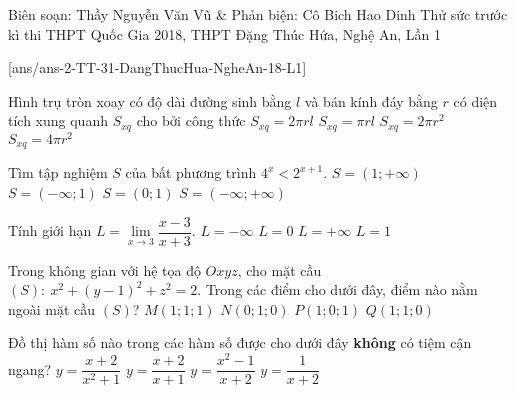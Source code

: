 \begin{name}
{Biên soạn: Thầy Nguyễn Văn Vũ \& Phản biện: Cô Bich Hao Dinh}
{Thử sức trước kì thi THPT Quốc Gia 2018, THPT Đặng Thúc Hứa, Nghệ An, Lần 1}
\end{name}
\setcounter{ex}{0}\setcounter{bt}{0}
[ans/ans-2-TT-31-DangThucHua-NgheAn-18-L1]
\begin{ex}%
Hình trụ tròn xoay có độ dài đường sinh bằng $l$ và bán kính đáy bằng $r$ có diện tích xung quanh $S_{xq}$ cho bởi công thức
\choice
{\True $S_{xq}=2\pi rl$}
{$S_{xq}=\pi rl$}
{$S_{xq}=2\pi r^2$}
{$S_{xq}=4\pi r^2$}
\loigiai{
}
\end{ex}

\begin{ex}%
Tìm tập nghiệm $S$ của bất phương trình $4^x<2^{x+1}$.
\choice
{$S=(1;+\infty)$}
{\True $S=(-\infty;1)$}
{$S=(0;1)$}
{$S=(-\infty;+\infty)$}
\end{ex}

\begin{ex}%
Tính giới hạn $L=\lim\limits_{x\to 3} \dfrac{x-3}{x+3}$.
\choice
{$L=-\infty$}
{\True $L=0$}
{$L=+\infty$}
{$L=1$}
\end{ex}

\begin{ex}%
Trong không gian với hệ tọa độ $Oxyz$, cho mặt cầu $(S):\ x^2+(y-1)^2+z^2=2$. Trong các điểm cho dưới đây, điểm nào nằm ngoài mặt cầu $(S)$?
\choice
{$M(1;1;1)$}
{$N(0;1;0)$}
{\True $P(1;0;1)$}
{$Q(1;1;0)$}
\end{ex}

\begin{ex}%
Đồ thị hàm số nào trong các hàm số được cho dưới đây \textbf{không} có tiệm cận ngang?
\choice
{$y=\dfrac{x+2}{x^2+1}$}
{$y=\dfrac{x+2}{x+1}$}
{\True $y=\dfrac{x^2-1}{x+2}$}
{$y=\dfrac{1}{x+2}$}
\end{ex}

